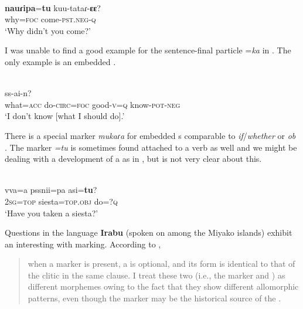 \ea%
    \label{ex:japa:39}
    \\
    \gll \textbf{{nauɾipa}}{=}\textbf{{tu}} kuu-tataɾ-\textbf{{ɛɛ}}?\\
    why=\textsc{foc}  come-\textsc{pst.neg}-\textsc{q}\\
    \glt ‘Why didn’t you come?’ \citep[211]{Pellard2009}
    \z

I was unable to find a good example for the sentence-final particle =\textit{ka} in \cite{Pellard2009,Pellard2010}. The only example is an embedded .

\ea%
    \label{ex:japa:40}
    \\
    \gll [\textbf{{nau}}=iu  as-sipa=\textbf{{tu}} tau-kaɯ=\textbf{{ka}}] ss-ai-n?\\
    what=\textsc{acc}  do-\textsc{circ}=\textsc{foc}    good-\textsc{v}=\textsc{q}  know-\textsc{pot}-\textsc{neg}\\
    \glt ‘I don’t know [what I should do].’ \citep[225]{Pellard2009}
    \z

There is a special marker \textit{mukaɾa} for embedded s comparable to  \textit{if}/\textit{whether} or  \textit{ob} \citep[221]{Pellard2009}. The  marker \textit{=tu} is sometimes found attached to a verb as well and we might be dealing with a development of a  as in , but \citet[192]{Pellard2009} is not very clear about this.

\ea%
    \label{ex:japa:41}
    \\
    \gll vva=a    pssnii=pa    asi=\textbf{{tu}}?\\
    2\textsc{sg}=\textsc{top}  siesta=\textsc{top.obj}    do=?\textsc{q}\\
    \glt ‘Have you taken a siesta?’ \citep[221]{Pellard2009}
    \z

Questions in the language \textbf{Irabu} (spoken on  among the Miyako islands) exhibit an interesting  with  marking. According to \citet[118]{Shimoji2011a},

\begin{quote}
when a  marker is present, a  is optional, and its form is identical to that of the  clitic in the same clause. I treat these two (i.e., the  marker and ) as different morphemes owing to the fact that they show different allomorphic patterns, even though the  marker may be the historical source of the .
\end{quote}

